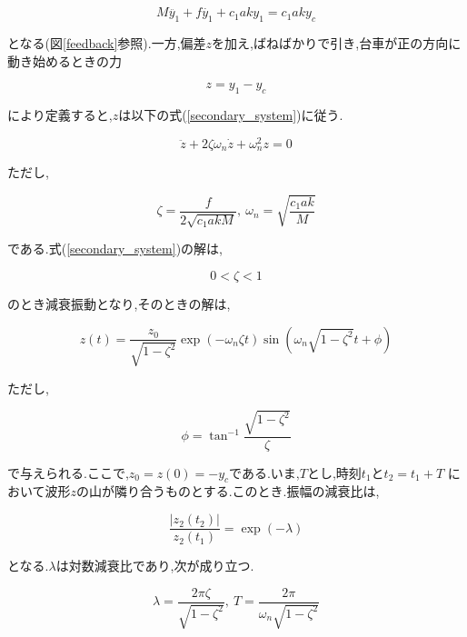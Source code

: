 \begin{enumerate}
\begin{itemize}
        \begin{equation}
            M \ddot{y_{1}} + f \dot{y_{1}} + c_{1}aky_{1} = c_{1}aky_{c}
        \end{equation}

        となる(図\ref{feedback}参照).一方,偏差$z$を加え,ばねばかりで引き,台車が正の方向に動き始めるときの力

        \begin{equation}
            z = y_{1} - y_{c}
        \end{equation}

        により定義すると,$z$は以下の式(\ref{secondary_system})に従う.

        \begin{equation}
            \ddot{z} + 2\zeta \omega_{n} \dot{z} + \omega_{n}^2 z = 0
            \label{secondary_system}
        \end{equation}

        ただし,

        \begin{equation}
            \zeta = \frac{f}{2\sqrt{c_{1}akM}},\ \omega_{n} = \sqrt{\frac{c_{1}ak}{M}}
            \label{zeta}
        \end{equation}

        である.式(\ref{secondary_system})の解は,

        $$
            0 < \zeta < 1
        $$

        のとき減衰振動となり,そのときの解は,

        $$
            z(t) = \frac{z_{0}}{\sqrt{1 - \zeta^2}} \exp(-\omega_{n} \zeta t)
            \sin{\left( \omega_{n} \sqrt{1 - \zeta^2}t + \phi \right)}
        $$

        ただし,
        
        $$
            \phi = \tan^{-1}{\frac{\sqrt{1 - \zeta^2}}{\zeta}}
        $$

        で与えられる.ここで,$z_{0} = z(0) = -y_{c}$である.いま,$T$とし,時刻$t_{1}$と$t_{2} = t_{1} + T$
        において波形$z$の山が隣り合うものとする.このとき.振幅の減衰比は,

        \begin{equation}
            \frac{|z_{2}(t_{2})|}{z_{2}(t_{1})} = \exp(-\lambda)
        \end{equation}

        となる.$\lambda$は対数減衰比であり,次が成り立つ.

        \begin{equation}
            \lambda = \frac{2\pi \zeta}{\sqrt{1 - \zeta^2}},\
            T = \frac{2\pi}{\omega_{n} \sqrt{1 - \zeta^2}}
            \label{lambda}
        \end{equation}


\end{itemize}
\end{enumerate}
